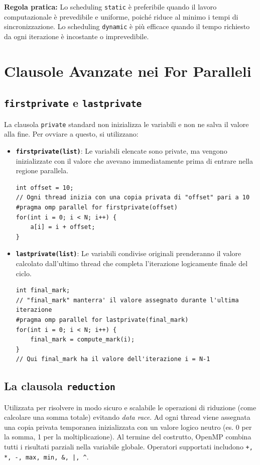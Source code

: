\noindent
\textbf{Regola pratica:} Lo scheduling \texttt{static} è preferibile quando il lavoro computazionale è prevedibile e uniforme, poiché riduce al minimo i tempi di sincronizzazione. Lo scheduling \texttt{dynamic} è più efficace quando il tempo richiesto da ogni iterazione è incostante o imprevedibile.

\section{Clausole Avanzate nei For Paralleli}

\subsection*{\texttt{firstprivate} e \texttt{lastprivate}}

La clausola \texttt{private} standard non inizializza le variabili e non ne salva il valore alla fine. Per ovviare a questo, si utilizzano:

\begin{itemize}
    \item \textbf{\texttt{firstprivate(list)}}: Le variabili elencate sono private, ma vengono inizializzate con il valore che avevano immediatamente prima di entrare nella regione parallela.
\begin{verbatim}
int offset = 10;
// Ogni thread inizia con una copia privata di "offset" pari a 10
#pragma omp parallel for firstprivate(offset)
for(int i = 0; i < N; i++) {
    a[i] = i + offset; 
}
\end{verbatim}

    \item \textbf{\texttt{lastprivate(list)}}: Le variabili condivise originali prenderanno il valore calcolato dall'ultimo thread che completa l'iterazione logicamente finale del ciclo.
\begin{verbatim}
int final_mark;
// "final_mark" manterra' il valore assegnato durante l'ultima iterazione
#pragma omp parallel for lastprivate(final_mark)
for(int i = 0; i < N; i++) {
    final_mark = compute_mark(i);
}
// Qui final_mark ha il valore dell'iterazione i = N-1
\end{verbatim}
\end{itemize}

\subsection{La clausola \texttt{reduction}}
Utilizzata per risolvere in modo sicuro e scalabile le operazioni di riduzione (come calcolare una somma totale) evitando \textit{data race}. Ad ogni thread viene assegnata una copia privata temporanea inizializzata con un valore logico neutro (es. 0 per la somma, 1 per la moltiplicazione). Al termine del costrutto, OpenMP combina tutti i risultati parziali nella variabile globale. Operatori supportati includono \texttt{+, *, -, max, min, \&, |, \^{}}.

